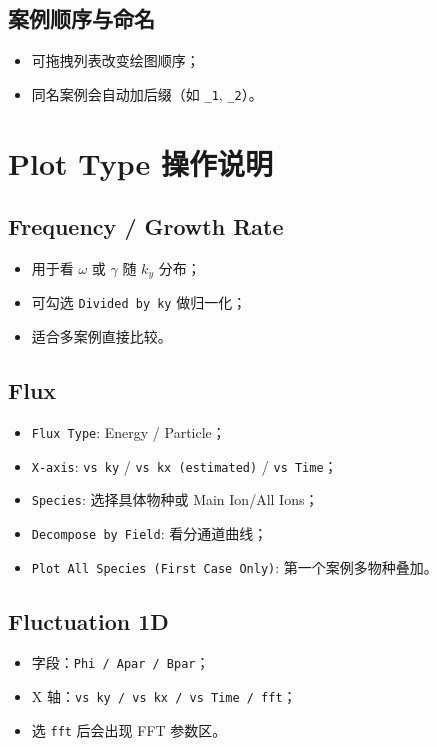 \documentclass[11pt,a4paper]{ctexart}
\begin{document}
\subsection{案例顺序与命名}
\begin{itemize}
  \item 可拖拽列表改变绘图顺序；
  \item 同名案例会自动加后缀（如 \texttt{\_1}, \texttt{\_2}）。
\end{itemize}

\section{Plot Type 操作说明}
\subsection{Frequency / Growth Rate}
\begin{itemize}
  \item 用于看 $\omega$ 或 $\gamma$ 随 $k_y$ 分布；
  \item 可勾选 \texttt{Divided by ky} 做归一化；
  \item 适合多案例直接比较。
\end{itemize}

\subsection{Flux}
\begin{itemize}
  \item \texttt{Flux Type}: Energy / Particle；
  \item \texttt{X-axis}: \texttt{vs ky} / \texttt{vs kx (estimated)} / \texttt{vs Time}；
  \item \texttt{Species}: 选择具体物种或 Main Ion/All Ions；
  \item \texttt{Decompose by Field}: 看分通道曲线；
  \item \texttt{Plot All Species (First Case Only)}: 第一个案例多物种叠加。
\end{itemize}

\subsection{Fluctuation 1D}
\begin{itemize}
  \item 字段：\texttt{Phi / Apar / Bpar}；
  \item X 轴：\texttt{vs ky / vs kx / vs Time / fft}；
  \item 选 \texttt{fft} 后会出现 FFT 参数区。
\end{itemize}
\end{document}
